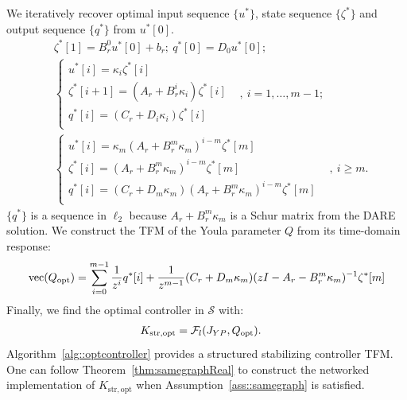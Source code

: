 
We iteratively recover optimal input sequence \(\{u^*\}\), state sequence \(\{\zeta^*\}\) and output sequence \(\{q^*\}\) from \(u^*[0]\).
\begin{equation}\label{eqn::YPrecovery1}
\begin{split}
    &\zeta^*[1] = B_r^0 u^*[0] + b_r;\ q^*[0] = D_0 u^*[0];\ \\
    &
    \begin{cases}
        u^*[i] = \kappa_i \zeta^*[i] &  \\
        \zeta^*[i+1] = (A_r + B_r^i \kappa_i)\zeta^*[i] & \\
        q^*[i] = (C_r + D_i \kappa_i)\zeta^*[i] & \\
    \end{cases} ,\ i = 1,\hdots,m-1;\\
    &
    \begin{cases}
        u^*[i] = \kappa_m (A_r + B_r^m \kappa_m)^{i-m} \zeta^*[m] &  \\
        \zeta^*[i] = (A_r + B_r^m \kappa_m)^{i-m}\zeta^*[m] & \\
        q^*[i] = (C_r + D_m \kappa_m) (A_r + B_r^m \kappa_m)^{i-m}\zeta^*[m] & \\
    \end{cases},\ i\geq m. 
\end{split}
\end{equation}
\(\{q^*\}\) is a sequence in \(\ell_2\) because \(A_r + B_r^m \kappa_m\) is a Schur matrix from the DARE solution. We construct the TFM of the Youla parameter \(Q\) from its time-domain response:
\begin{equation}\label{eqn::YPrecovery2}
    {\mathrm{vec}}(Q_\mathrm{opt}) = \sum_{i=0}^{m-1} \frac{1}{z^i} q^*[i] + \frac{1}{z^{m-1}}(C_r + D_m \kappa_m) (zI- A_r - B_r^m \kappa_m)^{-1}\zeta^*[m] 
\end{equation}
Finally, we find the optimal controller in \(\mathcal{S}\) with:
\begin{equation}\label{eqn::Krecovery}
\begin{split}
 K_\mathrm{str, opt}& ={\mathcal{F}_l}(J_{YP}, Q_\mathrm{opt}).
 \end{split}
\end{equation}
Algorithm~\ref{alg::optcontroller} provides a structured stabilizing controller TFM. One can follow Theorem~\ref{thm:samegraphReal} to construct the networked implementation of \(K_\mathrm{str, opt}\) when Assumption~\ref{ass::samegraph} is satisfied.

